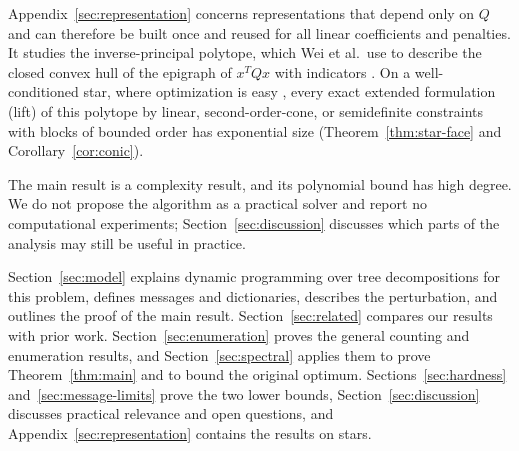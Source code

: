 Appendix~\ref{sec:representation} concerns representations that depend
only on $Q$ and can therefore be built once and reused for all linear
coefficients and penalties. It studies the inverse-principal polytope,
which Wei et al.\ use to describe the closed convex hull of the
epigraph of $x^TQx$ with indicators \cite{WeiHull}. On a
well-conditioned star, where optimization is easy \cite{BhathenaTrees},
every exact extended formulation (lift) of this polytope by linear,
second-order-cone, or semidefinite constraints with blocks of bounded
order has exponential size (Theorem~\ref{thm:star-face} and
Corollary~\ref{cor:conic}).

The main result is a complexity result, and its polynomial bound has
high degree. We do not propose the algorithm as a practical solver and
report no computational experiments; Section~\ref{sec:discussion}
discusses which parts of the analysis may still be useful in practice.

Section~\ref{sec:model} explains dynamic programming over tree
decompositions for this problem, defines messages and dictionaries,
describes the perturbation, and outlines the proof of the main result.
Section~\ref{sec:related} compares our results with prior work.
Section~\ref{sec:enumeration} proves the general counting and
enumeration results, and Section~\ref{sec:spectral} applies them to
prove Theorem~\ref{thm:main} and to bound the original optimum.
Sections~\ref{sec:hardness} and~\ref{sec:message-limits} prove the two
lower bounds, Section~\ref{sec:discussion} discusses practical relevance
and open questions, and Appendix~\ref{sec:representation} contains the
results on stars.
